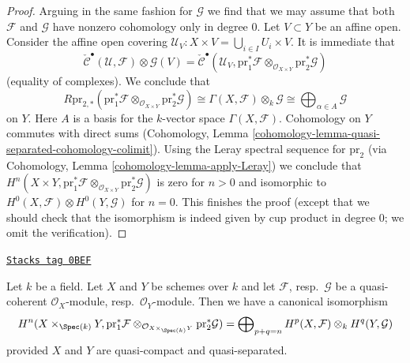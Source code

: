 \begin{proof}
\medskip\noindent
Arguing in the same fashion for $\mathcal{G}$ we find that we
may assume that both $\mathcal{F}$ and $\mathcal{G}$
have nonzero cohomology only in degree $0$.
Let $V \subset Y$ be an affine open. Consider the affine open covering
$\mathcal{U}_V : X \times V = \bigcup_{i \in I} U_i \times V$.
It is immediate that
$$
\check{\mathcal{C}}^\bullet(\mathcal{U}, \mathcal{F}) \otimes \mathcal{G}(V) =
\check{\mathcal{C}}^\bullet(\mathcal{U}_V,
\text{pr}_1^*\mathcal{F} \otimes_{\mathcal{O}_{X \times Y}}
\text{pr}_2^*\mathcal{G})
$$
(equality of complexes). We conclude that
$$
R\text{pr}_{2, *}(\text{pr}_1^*\mathcal{F} \otimes_{\mathcal{O}_{X \times Y}}
\text{pr}_2^*\mathcal{G})
\cong
\Gamma(X, \mathcal{F}) \otimes_k \mathcal{G} \cong
\bigoplus\nolimits_{\alpha \in A} \mathcal{G}
$$
on $Y$. Here $A$ is a basis for the $k$-vector space $\Gamma(X, \mathcal{F})$.
Cohomology on $Y$ commutes with direct sums
(Cohomology, Lemma \ref{cohomology-lemma-quasi-separated-cohomology-colimit}).
Using the Leray spectral sequence for $\text{pr}_2$
(via Cohomology, Lemma \ref{cohomology-lemma-apply-Leray})
we conclude that
$H^n(X \times Y, \text{pr}_1^*\mathcal{F} \otimes_{\mathcal{O}_{X \times Y}}
\text{pr}_2^*\mathcal{G})$
is zero for $n > 0$ and isomorphic to
$H^0(X, \mathcal{F}) \otimes H^0(Y, \mathcal{G})$ for $n = 0$.
This finishes the proof (except that we should check that the
isomorphism is indeed given by cup product in degree $0$; we omit
the verification).
\end{proof}

\begin{lemma}
\label{varieties-lemma-kunneth-general}
\href{https://stacks.math.columbia.edu/tag/0BEF}{\texttt{Stacks tag 0BEF}}

Let $k$ be a field. Let $X$ and $Y$ be schemes over $k$ and
let $\mathcal{F}$, resp.\ $\mathcal{G}$ be a quasi-coherent
$\mathcal{O}_X$-module, resp.\ $\mathcal{O}_Y$-module.
Then we have a canonical isomorphism
$$
H^n(X \times_{\Spec(k)} Y, \text{pr}_1^*\mathcal{F}
\otimes_{\mathcal{O}_{X \times_{\Spec(k)} Y}} \text{pr}_2^*\mathcal{G}) =
\bigoplus\nolimits_{p + q = n}
H^p(X, \mathcal{F}) \otimes_k H^q(Y, \mathcal{G})
$$
provided $X$ and $Y$ are quasi-compact and quasi-separated.
\end{lemma}


